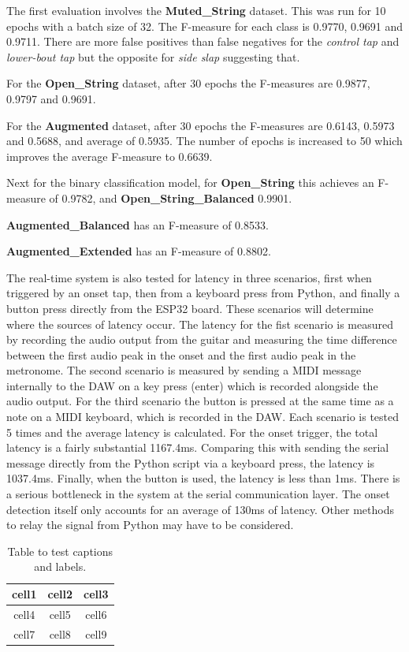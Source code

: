 \documentclass[conference]{IEEEtran}
\begin{document}
The first evaluation involves the \textbf{Muted\_String} dataset. This was run for 10 epochs with a batch size of 32. The F-measure for each class is 0.9770, 0.9691 and 0.9711. 
There are more false positives than false negatives for the \emph{control tap} and \emph{lower-bout tap} but the opposite for \emph{side slap} suggesting that. 

For the \textbf{Open\_String} dataset, after 30 epochs the F-measures are 0.9877, 0.9797 and 0.9691.

For the \textbf{Augmented} dataset, after 30 epochs the F-measures are 0.6143, 0.5973 and 0.5688, and average of 0.5935. The number of epochs is increased to 50 which improves the average
F-measure to 0.6639.

Next for the binary classification model, for \textbf{Open\_String} this achieves an F-measure of 0.9782, and \textbf{Open\_String\_Balanced} 0.9901. 

\textbf{Augmented\_Balanced} has an F-measure of 0.8533. 

\textbf{Augmented\_Extended} has an F-measure of 0.8802.


The real-time system is also tested for latency in three scenarios, first when triggered by an onset tap, then from a keyboard press from Python, and finally a button press directly from the
ESP32 board. These scenarios will determine where the sources of latency occur. The latency for the fist scenario is measured by recording the audio output from the guitar and measuring the time difference between the first audio peak in the onset and the first audio peak in the metronome.
The second scenario is measured by sending a MIDI message internally to the DAW on a key press (enter) which is recorded alongside the audio output. For the third scenario the button is pressed at the same time as a note on a MIDI keyboard, which is recorded in the DAW. 
Each scenario is tested 5 times and the average latency is calculated. For the onset trigger, the total latency is a fairly substantial 1167.4ms. Comparing this with sending
the serial message directly from the Python script via a keyboard press, the latency is 1037.4ms. Finally, when the button is used, the latency is less than 1ms.
There is a serious bottleneck in the system at the serial communication layer. The onset detection itself only accounts for an average of 130ms of latency. Other methods to relay the signal
from Python may have to be considered.



    \begin{table}[!t]
    \caption{Table to test captions and labels.}
    \centering
    \begin{tabular}{ |c|c|c| } 
     \hline
     cell1 & cell2 & cell3 \\ 
     \hline
     cell4 & cell5 & cell6 \\ 
     cell7 & cell8 & cell9 \\ 
     \hline
    \end{tabular}
    
\end{table}
\end{document}
